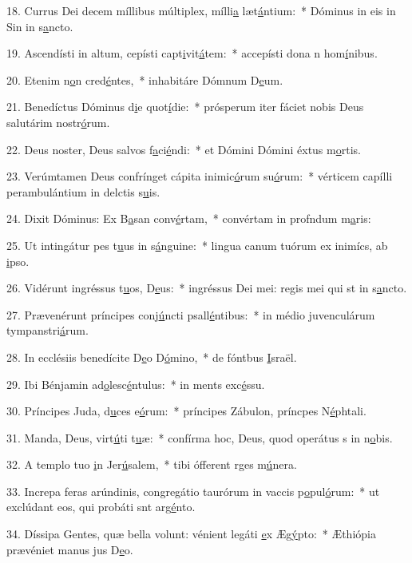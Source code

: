 18. Currus Dei decem míllibus múltiplex, mílli\uline{a} læt\uline{á}ntium:~* Dóminus in eis in Sin in s\uline{a}ncto.\par 
19. Ascendísti in altum, cepísti capt\uline{i}vit\uline{á}tem:~* accepísti dona n hom\uline{í}nibus.\par 
20. Etenim n\uline{o}n cred\uline{é}ntes,~* inhabitáre Dómnum D\uline{e}um.\par 
21. Benedíctus Dóminus d\uline{i}e quot\uline{í}die:~* prósperum iter fáciet nobis Deus salutárim nostr\uline{ó}rum.\par 
22. Deus noster, Deus salvos f\uline{a}ci\uline{é}ndi:~* et Dómini Dómini éxtus m\uline{o}rtis.\par 
23. Verúmtamen Deus confrínget cápita inimic\uline{ó}rum su\uline{ó}rum:~* vérticem capílli perambulántium in delctis s\uline{u}is.\par 
24. Dixit Dóminus: Ex B\uline{a}san conv\uline{é}rtam,~* convértam in profndum m\uline{a}ris:\par 
25. Ut intingátur pes t\uline{u}us in s\uline{á}nguine:~* lingua canum tuórum ex inimícs, ab \uline{i}pso.\par 
26. Vidérunt ingréssus t\uline{u}os, D\uline{e}us:~* ingréssus Dei mei: regis mei qui st in s\uline{a}ncto.\par 
27. Prævenérunt príncipes conj\uline{ú}ncti psall\uline{é}ntibus:~* in médio juvenculárum tympanstri\uline{á}rum.\par 
28. In ecclésiis benedícite D\uline{e}o D\uline{ó}mino,~* de fóntbus \uline{I}sraël.\par 
29. Ibi Bénjamin ad\uline{o}lesc\uline{é}ntulus:~* in ments exc\uline{é}ssu.\par 
30. Príncipes Juda, d\uline{u}ces e\uline{ó}rum:~* príncipes Zábulon, príncpes N\uline{é}phtali.\par 
31. Manda, Deus, virt\uline{ú}ti t\uline{u}æ:~* confírma hoc, Deus, quod operátus s in n\uline{o}bis.\par 
32. A templo tuo \uline{i}n Jer\uline{ú}salem,~* tibi ófferent rges m\uline{ú}nera.\par 
33. Increpa feras arúndinis, congregátio taurórum in vaccis p\uline{o}pul\uline{ó}rum:~* ut exclúdant eos, qui probáti snt arg\uline{é}nto.\par 
34. Díssipa Gentes, quæ bella volunt: vénient legáti \uline{e}x Æg\uline{ý}pto:~* Æthiópia prævéniet manus jus D\uline{e}o.\par 
